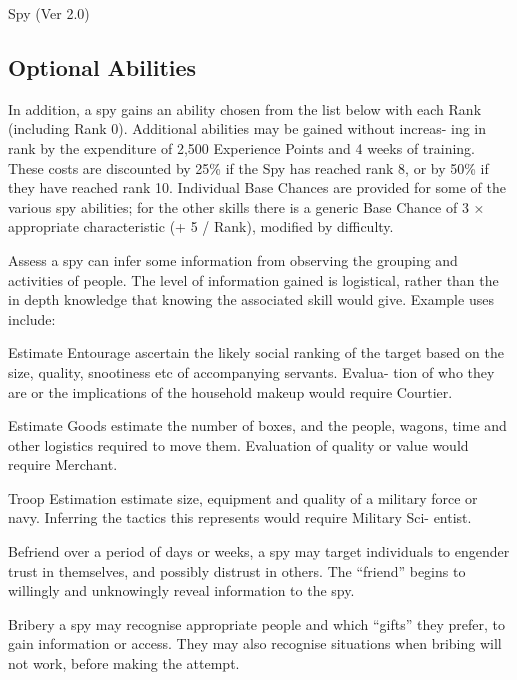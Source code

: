 \begin{Chapter}{Spy (Ver 2.0)}
\subsection{Optional Abilities}

In addition, a spy gains an ability chosen from the list below with
each Rank (including Rank 0).  Additional abilities may be gained
without increas- ing in rank by the expenditure of 2,500 Experience
Points and 4 weeks of training.  These costs are discounted by 25\% if
the Spy has reached rank 8, or by 50\% if they have reached rank
10. Individual Base Chances are provided for some of the various spy
abilities; for the other skills there is a generic Base Chance of 3 ×
appropriate characteristic (+ 5 / Rank), modified by difficulty.

\begin{Description}
\item[Assess] a spy can infer some information from observing the
  grouping and activities of people.  The level of information gained
  is logistical, rather than the in depth knowledge that knowing the
  associated skill would give. Example uses include:
\begin{Itemize}
\item Estimate Entourage ascertain the likely social ranking of the
  target based on the size, quality, snootiness etc of accompanying
  servants.  Evalua- tion of who they are or the implications of the
  household makeup would require Courtier.

\item Estimate Goods estimate the number of boxes, and the people,
  wagons, time and other logistics required to move them.  Evaluation
  of quality or value would require Merchant.

\item Troop Estimation estimate size, equipment and quality of a
  military force or navy.  Inferring the tactics this represents would
  require Military Sci- entist.
\end{Itemize}

\item[Befriend] over a period of days or weeks, a spy may target
  individuals to engender trust in themselves, and possibly distrust
  in others. The “friend” begins to willingly and unknowingly reveal
  information to the spy.

\item[Bribery] a spy may recognise appropriate people and which
  “gifts” they prefer, to gain information or access. They may also
  recognise situations when bribing will not work, before making the
  attempt.


\end{Description}
\end{Chapter}
